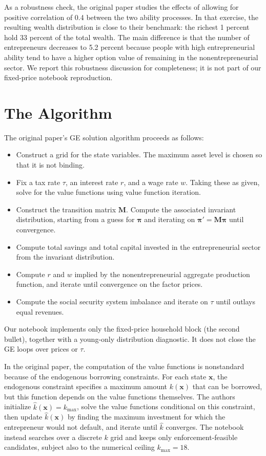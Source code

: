 \documentclass[\latexroot/\projectname]{subfiles}
\begin{document}
As a robustness check, the original paper studies the effects of allowing for positive correlation of 0.4 between the two ability processes. In that exercise, the resulting wealth distribution is close to their benchmark: the richest 1 percent hold 33 percent of the total wealth. The main difference is that the number of entrepreneurs decreases to 5.2 percent because people with high entrepreneurial ability tend to have a higher option value of remaining in the nonentrepreneurial sector. We report this robustness discussion for completeness; it is not part of our fixed-price notebook reproduction.

\section{The Algorithm}
\whenintegrated{\label{sec:appendix-algorithm}}

The original paper's GE solution algorithm proceeds as follows:
\begin{itemize}
  \item Construct a grid for the state variables. The maximum asset level is chosen so that it is not binding.
  \item Fix a tax rate $\tau$, an interest rate $r$, and a wage rate $w$. Taking these as given, solve for the value functions using value function iteration.
  \item Construct the transition matrix $\mathbf{M}$. Compute the associated invariant distribution, starting from a guess for $\boldsymbol{\pi}$ and iterating on $\boldsymbol{\pi}' = \mathbf{M}\boldsymbol{\pi}$ until convergence.
  \item Compute total savings and total capital invested in the entrepreneurial sector from the invariant distribution.
  \item Compute $r$ and $w$ implied by the nonentrepreneurial aggregate production function, and iterate until convergence on the factor prices.
  \item Compute the social security system imbalance and iterate on $\tau$ until outlays equal revenues.
\end{itemize}

Our notebook implements only the fixed-price household block (the second bullet), together with a young-only distribution diagnostic. It does not close the GE loops over prices or $\tau$.

In the original paper, the computation of the value functions is nonstandard because of the endogenous borrowing constraints. For each state $\mathbf{x}$, the endogenous constraint specifies a maximum amount $k(\mathbf{x})$ that can be borrowed, but this function depends on the value functions themselves. The authors initialize $\hat{k}(\mathbf{x}) = k_{\max}$, solve the value functions conditional on this constraint, then update $\hat{k}(\mathbf{x})$ by finding the maximum investment for which the entrepreneur would not default, and iterate until $\hat{k}$ converges. The notebook instead searches over a discrete $k$ grid and keeps only enforcement-feasible candidates, subject also to the numerical ceiling $k_{\max}=18$.

\smartbib
\end{document}
